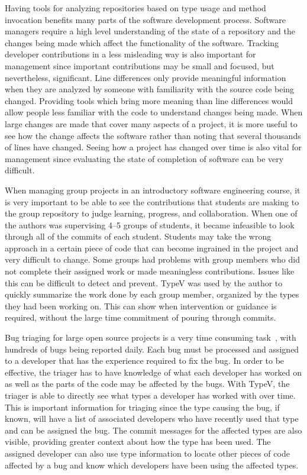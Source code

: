 Having tools for analyzing repositories based on type usage and method invocation benefits many parts of the software development process. Software managers require a high level understanding of the state of a repository and the changes being made which affect the functionality of the software. Tracking developer contributions in a less misleading way is also important for management since important contributions may be small and focused, but nevertheless, significant. Line differences only provide meaningful information when they are analyzed by someone with familiarity with the source code being changed. Providing tools which bring more meaning than line differences would allow people less familiar with the code to understand changes being made. When large changes are made that cover many aspects of a project, it is more useful to see how the change affects the software rather than noting that several thousands of lines have changed. Seeing how a project has changed over time is also vital for management since evaluating the state of completion of software can be very difficult.

When managing group projects in an introductory software engineering course, it is very important to be able to see the contributions that students are making to the group repository to judge learning, progress, and collaboration. When one of the authors was supervising 4--5 groups of students, it became infeasible to look through all of the commits of each student. Students may take the wrong approach in a certain piece of code that can become ingrained in the project and very difficult to change. Some groups had problems with group members who did not complete their assigned work or made meaningless contributions. Issues like this can be difficult to detect and prevent. TypeV was used by the author to quickly summarize the work done by each group member, organized by the types they had been working on. This can show when intervention or guidance is required, without the large time commitment of pouring through commits.


Bug triaging for large open source projects is a very time consuming task~\cite{badashian2015}, with hundreds  of bugs being reported daily. Each bug must be processed and assigned to a developer that has the experience required to fix the bug. In order to be effective, the triager has to have knowledge of what each developer has worked on as well as the parts of the code may be affected by the bugs. With TypeV, the triager is able to directly see what types a developer has worked with over time. This is important information for triaging since the type causing the bug, if known, will have a list of associated developers who have recently used that type and can be assigned the bug. The commit messages for the affected types are also visible, providing greater context about how the type has been used. The assigned developer can also use type information to locate other pieces of code affected by a bug and know which developers have been using the affected types.

